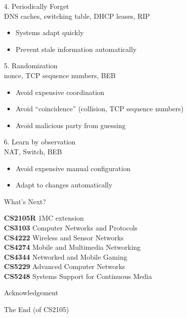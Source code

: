 \begin{cf}
	4. Periodically Forget\\
	\vspace{1cm}
	DNS caches, switching table, DHCP leases, RIP
\end{cf}

\begin{cf}{\small
	\begin{itemize}
	\item Systems adapt quickly
	\item Prevent stale information automatically
	\end{itemize}
}
\end{cf}

\begin{cf}
	5. Randomization\\
	\vspace{1cm}
	nonce, TCP sequence numbers, BEB
\end{cf}

\begin{cf}{\small
	\begin{itemize}
	\item Avoid expensive coordination
	\item Avoid ``coincidence'' (collision, TCP sequence numbers)
	\item Avoid malicious party from guessing
	\end{itemize}
}
\end{cf}

\begin{cf}
	6. Learn by observation\\
	\vspace{1cm}
	NAT, Switch, BEB
\end{cf}

\begin{cf}{\small
	\begin{itemize}
	\item Avoid expensive manual configuration
	\item Adapt to changes automatically
	\end{itemize}
}
\end{cf}

\begin{cf}
What's Next?
\end{cf}

\begin{frame}\small
\textbf{CS2105R} 1MC extension\\
\textbf{CS3103} Computer Networks and Protocols\\
\textbf{CS4222} Wireless and Sensor Networks\\
\textbf{CS4274} Mobile and Multimedia Networking\\
\textbf{CS4344} Networked and Mobile Gaming\\
\textbf{CS5229} Advanced Computer Networks\\
\textbf{CS5248} Systems Support for Continuous Media
\end{frame}

\begin{cf}
Acknowledgement
\end{cf}

\begin{cf}
The End
{\tiny (of CS2105)}
\end{cf}

